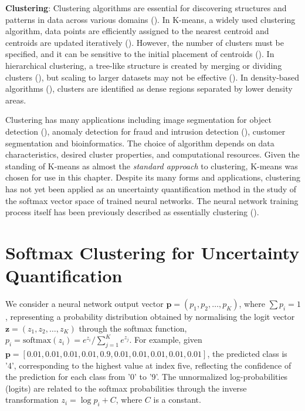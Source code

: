 \noindent \textbf{Clustering}: Clustering algorithms are essential for discovering structures and patterns in data across various domains (\cite{xu2015comprehensive}). In K-means, a widely used clustering algorithm, data points are efficiently assigned to the nearest centroid and centroids are updated iteratively (\cite{lloyd1982least}). However, the number of clusters must be specified, and it can be sensitive to the initial placement of centroids (\cite{arthur2007k}). In hierarchical clustering, a tree-like structure is created by merging or dividing clusters (\cite{johnson1967hierarchical}), but scaling to larger datasets may not be effective (\cite{mullner2011modern}). In density-based algorithms (\cite{ester1996density,schubert2017dbscan}), clusters are identified as dense regions separated by lower density areas.

Clustering has many applications including image segmentation for object detection (\cite{shi2000normalized}), anomaly detection for fraud and intrusion detection (\cite{chandola2009anomaly}), customer segmentation and bioinformatics. The choice of algorithm depends on data characteristics, desired cluster properties, and computational resources. Given the standing of K-means as almost the \textit{standard approach} to clustering, K-means was chosen for use in this chapter. Despite its many forms and applications, clustering has not yet been applied as an uncertainty quantification method in the study of the softmax vector space of trained neural networks. The neural network training process itself has been previously described as essentially clustering (\cite{HessEtAl2020}).

\section{Softmax Clustering for Uncertainty Quantification}
\label{methods:clustering}

\sloppy

We consider a neural network output vector $\mathbf{p} = (p_1, p_2, \dots, p_K)$, where $\sum p_i = 1$, representing a probability distribution obtained by normalising the logit vector $\mathbf{z} = (z_1, z_2, \dots, z_K)$ through the softmax function, $p_i = \text{softmax}(z_i) = e^{z_i} / \sum_{j=1}^{K} e^{z_j}$. For example, given $\mathbf{p} = [0.01, 0.01, 0.01, 0.01, 0.9, 0.01, 0.01, 0.01, 0.01, 0.01]$, the predicted class is '4', corresponding to the highest value at index five, reflecting the confidence of the prediction for each class from '0' to '9'. The unnormalized log-probabilities (logits) are related to the softmax probabilities through the inverse transformation $z_i = \log p_i + C$, where $C$ is a constant.

